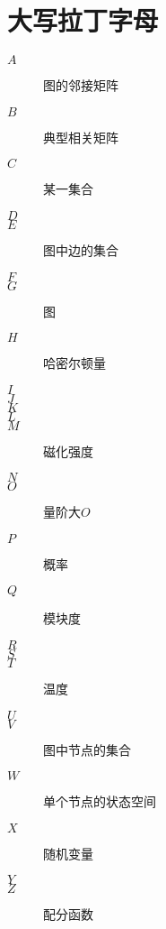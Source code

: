\documentclass{ctexart}
\begin{document}
\section{大写拉丁字母}
\begin{description}
    \item[$A$] 图的邻接矩阵
    \item[$B$] 典型相关矩阵
    \item[$C$] 某一集合
    \item[$D$] 
    \item[$E$] 图中边的集合
    \item[$F$] 
    \item[$G$] 图
    \item[$H$] 哈密尔顿量
    \item[$I$] 
    \item[$J$] 
    \item[$K$] 
    \item[$L$] 
    \item[$M$] 磁化强度
    \item[$N$] 
    \item[$O$] 量阶大$O$
    \item[$P$] 概率
    \item[$Q$] 模块度
    \item[$R$] 
    \item[$S$] 
    \item[$T$] 温度
    \item[$U$] 
    \item[$V$] 图中节点的集合
    \item[$W$] 单个节点的状态空间
    \item[$X$] 随机变量
    \item[$Y$] 
    \item[$Z$] 配分函数
\end{description}
\end{document}
